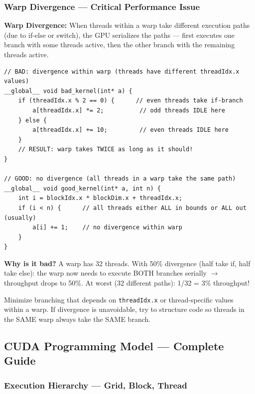 \documentclass[11pt,a4paper]{article}
\newcommand{\code}[1]{\texttt{\small\colorbox{codebg}{\color{codekw}#1}}}
\begin{document}
\subsubsection{Warp Divergence --- Critical Performance Issue}

\begin{mydef}
\textbf{Warp Divergence:} When threads within a warp take different execution paths (due to if-else or switch), the GPU serializes the paths --- first executes one branch with some threads active, then the other branch with the remaining threads active.
\end{mydef}

\begin{lstlisting}
// BAD: divergence within warp (threads have different threadIdx.x values)
__global__ void bad_kernel(int* a) {
    if (threadIdx.x % 2 == 0) {      // even threads take if-branch
        a[threadIdx.x] *= 2;          // odd threads IDLE here
    } else {
        a[threadIdx.x] += 10;         // even threads IDLE here
    }
    // RESULT: warp takes TWICE as long as it should!
}

// GOOD: no divergence (all threads in a warp take the same path)
__global__ void good_kernel(int* a, int n) {
    int i = blockIdx.x * blockDim.x + threadIdx.x;
    if (i < n) {      // all threads either ALL in bounds or ALL out (usually)
        a[i] += 1;    // no divergence within warp
    }
}
\end{lstlisting}

\textbf{Why is it bad?} A warp has 32 threads. With 50\% divergence (half take if, half take else): the warp now needs to execute BOTH branches serially $\to$ throughput drops to 50\%. At worst (32 different paths): 1/32 = 3\% throughput!

\begin{keypoint}
Minimize branching that depends on \code{threadIdx.x} or thread-specific values within a warp. If divergence is unavoidable, try to structure code so threads in the SAME warp always take the SAME branch.
\end{keypoint}

\subsection{CUDA Programming Model --- Complete Guide}

\subsubsection{Execution Hierarchy --- Grid, Block, Thread}
\end{document}
